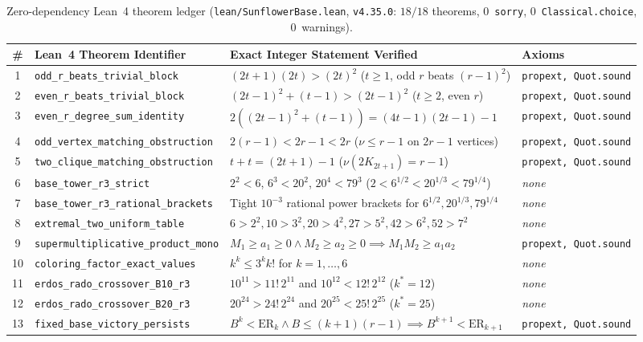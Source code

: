 \documentclass[11pt,a4paper]{article}
\theoremstyle{definition}
\theoremstyle{remark}
\begin{document}
\begin{table}[t]
\centering
\caption{Zero-dependency Lean~4 theorem ledger (\texttt{lean/SunflowerBase.lean}, \texttt{v4.35.0}: $18/18$ theorems, $0$~\texttt{sorry}, $0$~\texttt{Classical.choice}, $0$~warnings).}
\label{tab:lean}
\scriptsize
\setlength{\tabcolsep}{2.5pt}
\begin{tabular}{@{}clll@{}}
\toprule
\# & Lean~4 Theorem Identifier & Exact Integer Statement Verified & Axioms \\
\midrule
1 & \texttt{odd\_r\_beats\_trivial\_block} & $(2t+1)(2t) > (2t)^2$ ($t \ge 1$, odd $r$ beats $(r-1)^2$) & \texttt{propext, Quot.sound} \\
2 & \texttt{even\_r\_beats\_trivial\_block} & $(2t-1)^2 + (t-1) > (2t-1)^2$ ($t \ge 2$, even $r$) & \texttt{propext, Quot.sound} \\
3 & \texttt{even\_r\_degree\_sum\_identity} & $2((2t-1)^2+(t-1)) = (4t-1)(2t-1)-1$ & \texttt{propext, Quot.sound} \\
4 & \texttt{odd\_vertex\_matching\_obstruction} & $2(r-1) < 2r-1 < 2r$ ($\nu \le r-1$ on $2r-1$ vertices) & \texttt{propext, Quot.sound} \\
5 & \texttt{two\_clique\_matching\_obstruction} & $t + t = (2t+1) - 1$ ($\nu(2K_{2t+1}) = r-1$) & \texttt{propext, Quot.sound} \\
6 & \texttt{base\_tower\_r3\_strict} & $2^2 < 6$, $6^3 < 20^2$, $20^4 < 79^3$ ($2 < 6^{1/2} < 20^{1/3} < 79^{1/4}$) & \emph{none} \\
7 & \texttt{base\_tower\_r3\_rational\_brackets} & Tight $10^{-3}$ rational power brackets for $6^{1/2}, 20^{1/3}, 79^{1/4}$ & \emph{none} \\
8 & \texttt{extremal\_two\_uniform\_table} & $6>2^2, 10>3^2, 20>4^2, 27>5^2, 42>6^2, 52>7^2$ & \emph{none} \\
9 & \texttt{supermultiplicative\_product\_mono} & $M_1 \ge a_1 \ge 0 \wedge M_2 \ge a_2 \ge 0 \implies M_1 M_2 \ge a_1 a_2$ & \texttt{propext, Quot.sound} \\
10 & \texttt{coloring\_factor\_exact\_values} & $k^k \le 3^k k!$ for $k = 1,\dots,6$ & \emph{none} \\
11 & \texttt{erdos\_rado\_crossover\_B10\_r3} & $10^{11} > 11!\,2^{11}$ and $10^{12} < 12!\,2^{12}$ ($k^* = 12$) & \emph{none} \\
12 & \texttt{erdos\_rado\_crossover\_B20\_r3} & $20^{24} > 24!\,2^{24}$ and $20^{25} < 25!\,2^{25}$ ($k^* = 25$) & \emph{none} \\
13 & \texttt{fixed\_base\_victory\_persists} & $B^k < \mathrm{ER}_k \wedge B \le (k+1)(r-1) \implies B^{k+1} < \mathrm{ER}_{k+1}$ & \texttt{propext, Quot.sound} \\

\end{tabular}
\end{table}
\end{document}
